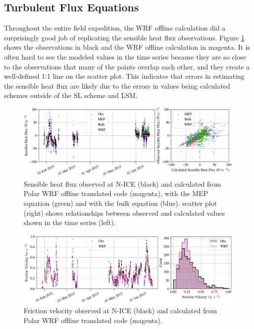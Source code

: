 \subsection{Turbulent Flux Equations}
Throughout the entire field expedition, the WRF offline calculation did a surprisingly good job of replicating the sensible heat flux observations. Figure \ref{fig:flux:sensible} shows the observations in black and the WRF offline calculation in magenta. It is often hard to see the modeled values in the time series because they are so close to the observations that many of the points overlap each other, and they create a well-defined 1:1 line on the scatter plot. This indicates that errors in estimating the sensible heat flux are likely due to the errors in values being calculated schemes outside of the SL scheme and LSM. 

\begin{figure}[t!]
    \centering
    \includegraphics[width=1\linewidth]{figures/chapter6/sensible_wrf.png}
    \caption[Sensible heat flux observed at N-ICE and calculated from Polar WRF offline translated code.]{Sensible heat flux observed at N-ICE (black) and calculated from Polar WRF offline translated code (magenta), with the MEP equation (green) and with the bulk equation (blue). scatter plot (right) shows relationships between observed and calculated values shown in the time series (left).}
    \label{fig:flux:sensible}
\end{figure}

\begin{figure}[b!]
    \centering
    \includegraphics[width=1\linewidth]{figures/chapter6/ustar_wrf.png}
    \caption[Friction velocity observed at N-ICE and calculated from Polar WRF offline translated code.]{Friction velocity observed at N-ICE (black) and calculated from Polar WRF offline translated code (magenta).}
    \label{fig:flux:ustar}
\end{figure}

